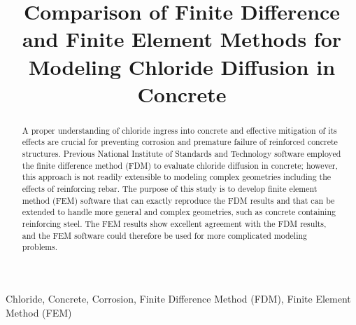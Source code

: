 \documentclass[conference]{IEEEtran}
\begin{document}
\title{Comparison of Finite Difference and Finite Element Methods for Modeling Chloride Diffusion in Concrete}

\author{
\and
{}
\and
{}
}


\maketitle

\begin{abstract}
A proper understanding of chloride ingress into concrete and effective mitigation of its effects are crucial for preventing corrosion and premature failure of reinforced concrete structures.
Previous National Institute of Standards and Technology software employed the finite difference method (FDM) to evaluate chloride diffusion in concrete; however, this approach is not readily extensible to modeling complex geometries including the effects of reinforcing rebar. 
The purpose of this study is to develop finite element method (FEM) software that can exactly reproduce the FDM results and that can be extended to handle more general and complex geometries, such as concrete containing reinforcing steel.
The FEM results show excellent agreement with the FDM results, and the FEM software could therefore be used for more complicated modeling problems.
\end{abstract}

\begin{IEEEkeywords}
Chloride, Concrete, Corrosion, Finite Difference Method (FDM), Finite Element Method (FEM)\end{IEEEkeywords}
\end{document}
